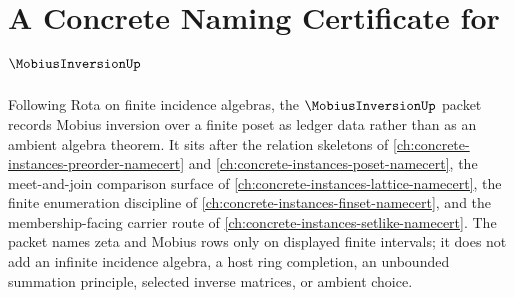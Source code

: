 \chapter{A Concrete Naming Certificate for $\MobiusInversionUp$}
\label{ch:concrete-instances-mobius-inversion-namecert}

Following Rota on finite incidence algebras, the $\MobiusInversionUp$ packet records Mobius inversion over a finite poset as ledger data rather than as an ambient algebra theorem. It sits after the relation skeletons of \autoref{ch:concrete-instances-preorder-namecert} and \autoref{ch:concrete-instances-poset-namecert}, the meet-and-join comparison surface of \autoref{ch:concrete-instances-lattice-namecert}, the finite enumeration discipline of \autoref{ch:concrete-instances-finset-namecert}, and the membership-facing carrier route of \autoref{ch:concrete-instances-setlike-namecert}. The packet names zeta and Mobius rows only on displayed finite intervals; it does not add an infinite incidence algebra, a host ring completion, an unbounded summation principle, selected inverse matrices, or ambient choice.

